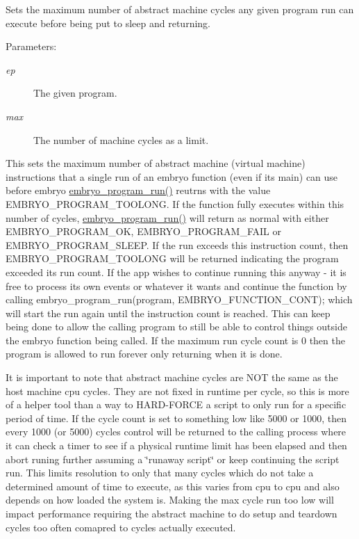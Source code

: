 Sets the maximum number of abstract machine cycles any given program run can execute before being put to sleep and returning. 

\begin{Desc}
\item[Parameters:]
\begin{description}
\item[{\em ep}]The given program. \item[{\em max}]The number of machine cycles as a limit.\end{description}
\end{Desc}
This sets the maximum number of abstract machine (virtual machine) instructions that a single run of an embryo function (even if its main) can use before embryo \hyperlink{group__Embryo__Run__Group_ga061469476a430fd33e89951300fd62a}{embryo\_\-program\_\-run()} reutrns with the value EMBRYO\_\-PROGRAM\_\-TOOLONG. If the function fully executes within this number of cycles, \hyperlink{group__Embryo__Run__Group_ga061469476a430fd33e89951300fd62a}{embryo\_\-program\_\-run()} will return as normal with either EMBRYO\_\-PROGRAM\_\-OK, EMBRYO\_\-PROGRAM\_\-FAIL or EMBRYO\_\-PROGRAM\_\-SLEEP. If the run exceeds this instruction count, then EMBRYO\_\-PROGRAM\_\-TOOLONG will be returned indicating the program exceeded its run count. If the app wishes to continue running this anyway - it is free to process its own events or whatever it wants and continue the function by calling embryo\_\-program\_\-run(program, EMBRYO\_\-FUNCTION\_\-CONT); which will start the run again until the instruction count is reached. This can keep being done to allow the calling program to still be able to control things outside the embryo function being called. If the maximum run cycle count is 0 then the program is allowed to run forever only returning when it is done.

It is important to note that abstract machine cycles are NOT the same as the host machine cpu cycles. They are not fixed in runtime per cycle, so this is more of a helper tool than a way to HARD-FORCE a script to only run for a specific period of time. If the cycle count is set to something low like 5000 or 1000, then every 1000 (or 5000) cycles control will be returned to the calling process where it can check a timer to see if a physical runtime limit has been elapsed and then abort runing further assuming a \char`\"{}runaway script\char`\"{} or keep continuing the script run. This limits resolution to only that many cycles which do not take a determined amount of time to execute, as this varies from cpu to cpu and also depends on how loaded the system is. Making the max cycle run too low will impact performance requiring the abstract machine to do setup and teardown cycles too often comapred to cycles actually executed.

